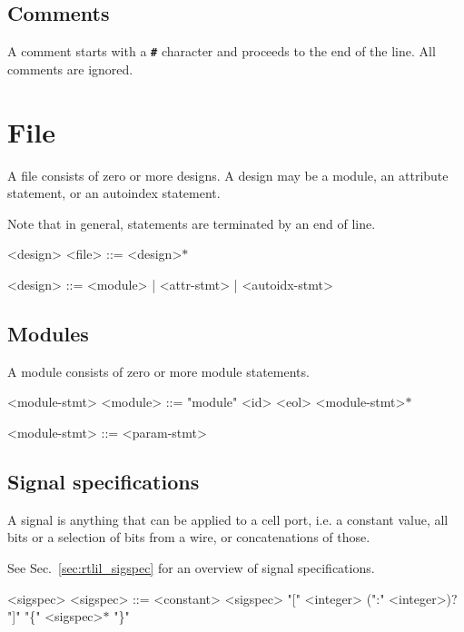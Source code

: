 \subsection{Comments}

A comment starts with a \texttt{\textbf{\#}} character and proceeds to the end of the line. All comments are ignored.

\section{File}

A file consists of zero or more designs. A design may be a module, an attribute statement, or an autoindex statement.

Note that in general, statements are terminated by an end of line.

\begin{indentgrammar}{<design>}
<file> ::= <design>$*$

<design> ::= <module> | <attr-stmt> | <autoidx-stmt>
\end{indentgrammar}

\subsection{Modules}

A module consists of zero or more module statements.

\begin{indentgrammar}{<module-stmt>}
<module> ::= "module" <id> <eol> <module-stmt>$*$

<module-stmt> ::= 
<param-stmt>
\end{indentgrammar}

\subsection{Signal specifications}

A signal is anything that can be applied to a cell port, i.e. a constant value, all bits or a selection of bits from a wire, or concatenations of those.

See Sec.~\ref{sec:rtlil_sigspec} for an overview of signal specifications.

\begin{indentgrammar}{<sigspec>}
<sigspec> ::=
<constant>
    \alt <sigspec> "[" <integer> (":" <integer>)$?$ "]"
    \alt "\{" <sigspec>$*$ "\}"
\end{indentgrammar}

